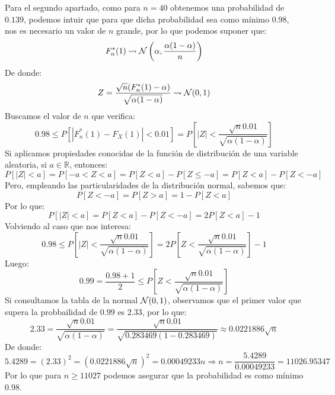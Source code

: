 \begin{ejercicio}
    \noindent
    Para el segundo apartado, como para $n=40$ obtenemos una probabilidad de $0.139$, podemos intuir que para que dicha probabilidad sea como mínimo $0.98$, nos es necesario un valor de $n$ grande, por lo que podemos suponer que:
    \begin{equation*}
        F_n^\ast(1) \rightsquigarrow \mathcal{N}\left(\alpha, \dfrac{\alpha(1-\alpha)}{n}\right)
    \end{equation*}
    De donde:
    \begin{equation*}
        Z = \dfrac{\sqrt{n}(F_n^\ast(1)-\alpha)}{\sqrt{\alpha(1-\alpha)}} \rightsquigarrow \mathcal{N}(0,1)
    \end{equation*}
    Buscamos el valor de $n$ que verifica:
    \begin{equation*}
        0.98 \leq P[|F_n^\ast(1) - F_X(1)| < 0.01] = P\left[|Z| < \dfrac{\sqrt{n}0.01}{\sqrt{\alpha(1-\alpha)}}\right]
    \end{equation*}
    Si aplicamos propiedades conocidas de la función de distribución de una variable aleatoria, si $a\in \mathbb{R}$, entonces:
    \begin{equation*}
        P[|Z| < a] = P[-a < Z < a] = P[Z<a] - P[Z\leq -a]
        = P[Z<a] - P[Z< -a]
    \end{equation*}
    Pero, empleando las particularidades de la distribución normal, sabemos que:
    \begin{equation*}
        P[Z< -a] = P[Z>a] = 1-P[Z<a]
    \end{equation*}
    Por lo que:
    \begin{equation*}
        P[|Z| < a] = P[Z<a] - P[Z < -a] = 2P[Z<a] - 1
    \end{equation*}
    Volviendo al caso que nos interesa:
    \begin{equation*}
        0.98 \leq P\left[|Z| < \dfrac{\sqrt{n}0.01}{\sqrt{\alpha(1-\alpha)}}\right] = 2P\left[Z<\dfrac{\sqrt{n}0.01}{\sqrt{\alpha(1-\alpha)}}\right] - 1
    \end{equation*}
    Luego:
    \begin{equation*}
        0.99 = \dfrac{0.98+1}{2} \leq P\left[Z < \dfrac{\sqrt{n}0.01}{\sqrt{\alpha(1-\alpha)}}\right]
    \end{equation*}
    Si consultamos la tabla de la normal $\mathcal{N}(0,1)$, observamos que el primer valor que supera la probbailidad de $0.99$ es $2.33$, por lo que:
    \begin{equation*}
        2.33 = \dfrac{\sqrt{n}0.01}{\sqrt{\alpha(1-\alpha)}} = \dfrac{\sqrt{n}0.01}{\sqrt{0.283469(1-0.283469)}} \approx 0.0221886 \sqrt{n}
    \end{equation*}
    De donde:
    \begin{equation*}
        5.4289 = {(2.33)}^{2} = {(0.0221886\sqrt{n})}^{2} = 0.00049233 n \Longrightarrow n = \dfrac{5.4289}{0.00049233} = 11026.95347
    \end{equation*}
    Por lo que para $n \geq 11027$ podemos asegurar que la probabilidad es como mínimo $0.98$.
\end{ejercicio}

